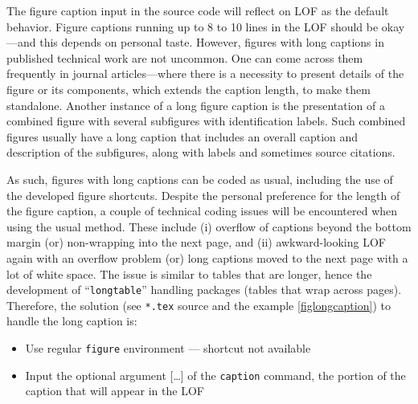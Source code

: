\documentclass[phd,showframe]{ndsu-thesis-2022}
\begin{document}
The figure caption input in the source code will reflect on LOF as the default behavior. Figure captions running up to 8 to 10 lines in the LOF should be okay---and this depends on personal taste. However, figures with long captions in published technical work are not uncommon. One can come across them frequently in journal articles---where there is a necessity to present details of the figure or its components, which extends the caption length, to make them standalone. Another instance of a long figure caption is the presentation of a combined figure with several subfigures with identification labels. Such combined figures usually have a long caption that includes an overall caption and description of the subfigures, along with labels and sometimes source citations.

As such, figures with long captions can be coded as usual, including the use of the developed figure shortcuts. Despite the personal preference for the length of the figure caption, a couple of technical coding issues will be encountered when using the usual method. These include (i) overflow of captions beyond the bottom margin (or) non-wrapping into the next page, and (ii) awkward-looking LOF again with an overflow problem (or) long captions moved to the next page with a lot of white space. The issue is similar to tables that are longer, hence the development of ``\texttt{longtable}'' handling packages (tables that wrap across pages). Therefore, the solution (see \texttt{*.tex} source and the example \cref{figlongcaption}) to handle the long caption is:

\begin{itemize}
\item Use regular \texttt{figure} environment --- shortcut not available
\item Input the optional argument [\ldots] of the \texttt{caption} command, the portion of the caption that will appear in the LOF
\end{itemize}
\end{document}

